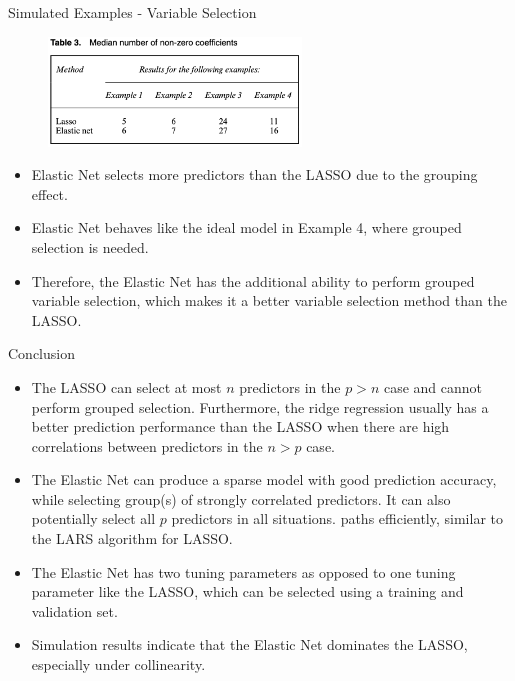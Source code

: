     \begin{frame}{Simulated Examples - Variable Selection}
        \begin{figure}
            \centering
            \includegraphics[width=0.6\textwidth]{img/Table 3.png}
        \end{figure}
        \begin{itemize}
            \item Elastic Net selects more predictors than the LASSO due to the grouping effect. 
            \item Elastic Net behaves like the ideal model in Example 4, where grouped selection is needed.
            \item Therefore, the Elastic Net has the additional ability to perform grouped variable selection, which makes it a better variable selection method than the LASSO.

        \end{itemize}
    \end{frame}
    \begin{frame}{Conclusion}
    \begin{itemize}
        \item The LASSO can select at most $n$ predictors in the $p>n$ case and cannot perform grouped selection. Furthermore, the ridge regression usually has a better prediction performance than the LASSO when there are high correlations between predictors in the $n>p$ case.
        \item The Elastic Net can produce a sparse model with good prediction accuracy, while
 selecting group(s) of strongly correlated predictors. It can also potentially select all $p$
 predictors in all situations.
 paths efficiently, similar to the LARS algorithm for LASSO.
        \item The Elastic Net has two tuning parameters as opposed to one tuning parameter like the LASSO, which can be selected using a training and validation set.
        \item Simulation results indicate that the Elastic Net dominates the LASSO, especially
 under collinearity.
    \end{itemize}
        
    \end{frame}

